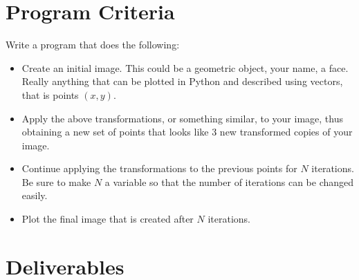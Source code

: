 \documentclass{article}
\def\prog#1{
\vspace{.1in}\begin{mdframed} \begin{center} \textbf{Programming Reminders} \end{center}#1 \end{mdframed} }
\begin{document}
 	
 	
 	
 	
 	
 	

	
	
	
	
	
	
	
	




\section*{Program Criteria}
	Write a program that does the following:
	\begin{itemize}
		\item Create an initial image.  This could be a geometric object, your name, a face.  Really anything that can be plotted in Python and described using vectors, that is points $(x,y)$.
		\item Apply the above transformations, or something similar, to your image, thus obtaining a new set of  points that looks like 3 new transformed copies of your image.
		\item Continue applying the transformations to the  previous points for $N$ iterations.  Be sure to make $N$ a variable so that the number of iterations can be changed easily.  
		\item Plot the final image that is created after $N$ iterations.
	\end{itemize}







\section*{Deliverables}
	
\end{document}
